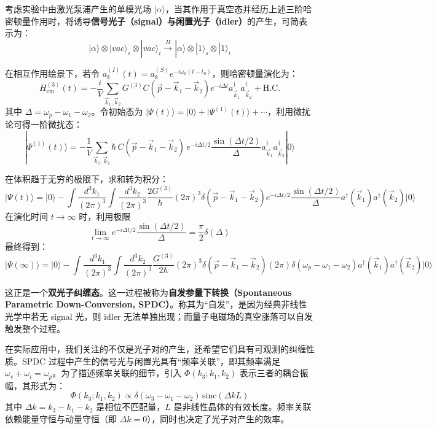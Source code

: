 考虑实验中由激光泵浦产生的单模光场 $|\alpha\rangle$，当其作用于真空态并经历上述三阶哈密顿量作用时，将诱导\textbf{信号光子（signal）与闲置光子（idler）}的产生，可简表示为：
\[
|\alpha\rangle \otimes |vac\rangle_s \otimes |vac\rangle_i \xrightarrow{H} |\alpha\rangle \otimes |1\rangle_s \otimes |1\rangle_i
\]

在相互作用绘景下，若令 $a_k^{(I)}(t) = a_k^{(S)} e^{-i\omega_k(t - t_0)}$，则哈密顿量演化为：
\[
H_{\text{em}}^{(3)}(t) = -\frac{i}{V} \sum_{\vec{k}_1, \vec{k}_2} G^{(3)} C(\vec{p} - \vec{k}_1 - \vec{k}_2) e^{-i\Delta t} a_{\vec{k}_1}^\dagger a_{\vec{k}_2}^\dagger + \text{H.C.}
\]
其中 $\Delta = \omega_p - \omega_1 - \omega_2$。令初始态为 $|\Psi(t)\rangle = |0\rangle + |\Psi^{(1)}(t)\rangle + \cdots$，利用微扰论可得一阶微扰态：
\[
|\Psi^{(1)}(t)\rangle = -\frac{1}{V} \sum_{\vec{k}_1, \vec{k}_2} \hbar \, C(\vec{p} - \vec{k}_1 - \vec{k}_2) \, e^{-i\Delta t/2} \frac{\sin(\Delta t/2)}{\Delta} a_{\vec{k}_1}^\dagger a_{\vec{k}_2}^\dagger |0\rangle
\]

在体积趋于无穷的极限下，求和转为积分：
\[
|\Psi(t)\rangle = |0\rangle - \int \frac{d^3k_1}{(2\pi)^3} \int \frac{d^3k_2}{(2\pi)^3} \frac{2G^{(3)}}{\hbar} (2\pi)^3 \delta(\vec{p} - \vec{k}_1 - \vec{k}_2) e^{-i\Delta t/2} \frac{\sin(\Delta t/2)}{\Delta} a^\dagger(\vec{k}_1) a^\dagger(\vec{k}_2) |0\rangle
\]
在演化时间 $t \to \infty$ 时，利用极限
\[
\lim_{t \to \infty} e^{-i\Delta t/2} \frac{\sin(\Delta t/2)}{\Delta} = \frac{\pi}{2} \delta(\Delta)
\]
最终得到：
\[
|\Psi(\infty)\rangle = |0\rangle - \int \frac{d^3k_1}{(2\pi)^3} \int \frac{d^3k_2}{(2\pi)^3} \frac{G^{(3)}}{2\hbar} (2\pi)^3 \delta(\vec{p} - \vec{k}_1 - \vec{k}_2) (2\pi) \delta(\omega_p - \omega_1 - \omega_2) a^\dagger(\vec{k}_1) a^\dagger(\vec{k}_2) |0\rangle
\]

这正是一个\textbf{双光子纠缠态}。这一过程被称为\textbf{自发参量下转换（Spontaneous Parametric Down-Conversion, SPDC）}。称其为“自发”，是因为经典非线性光学中若无 signal 光，则 idler 无法单独出现；而量子电磁场的真空涨落可以自发触发整个过程。

在实际应用中，我们关注的不仅是光子对的产生，还希望它们具有可观测的纠缠性质。SPDC 过程中产生的信号光与闲置光具有“频率关联”，即其频率满足 $\omega_s + \omega_i = \omega_p$。为了描述频率关联的细节，引入 $\Phi(k_3; k_1, k_2)$ 表示三者的耦合振幅，其形式为：
\[
\Phi(k_3; k_1, k_2) \propto \delta(\omega_3 - \omega_1 - \omega_2) \, \text{sinc}(\Delta k L)
\]
其中 $\Delta k = k_3 - k_1 - k_2$ 是相位不匹配量，$L$ 是非线性晶体的有效长度。频率关联依赖能量守恒与动量守恒（即 $\Delta k = 0$），同时也决定了光子对产生的效率。

